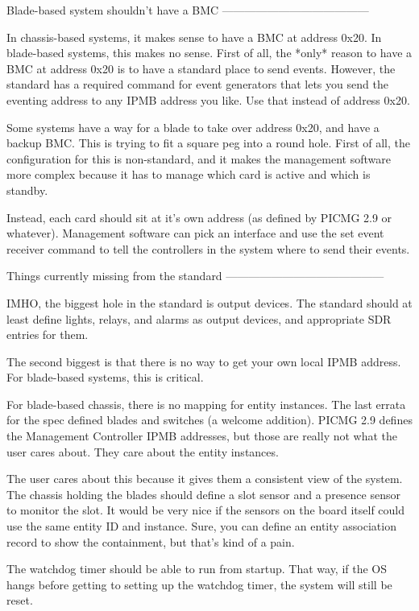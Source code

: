 Blade-based system shouldn't have a BMC
---------------------------------------

In chassis-based systems, it makes sense to have a BMC at address
0x20.  In blade-based systems, this makes no sense.  First of all, the
*only* reason to have a BMC at address 0x20 is to have a standard
place to send events.  However, the standard has a required command
for event generators that lets you send the eventing address to any
IPMB address you like.  Use that instead of address 0x20.

Some systems have a way for a blade to take over address 0x20, and
have a backup BMC.  This is trying to fit a square peg into a round
hole.  First of all, the configuration for this is non-standard, and
it makes the management software more complex because it has to manage
which card is active and which is standby.

Instead, each card should sit at it's own address (as defined by PICMG
2.9 or whatever).  Management software can pick an interface and use
the set event receiver command to tell the controllers in the system
where to send their events.


Things currently missing from the standard
------------------------------------------

IMHO, the biggest hole in the standard is output devices.  The
standard should at least define lights, relays, and alarms as output
devices, and appropriate SDR entries for them.

The second biggest is that there is no way to get your own local IPMB
address.  For blade-based systems, this is critical.

For blade-based chassis, there is no mapping for entity instances.
The last errata for the spec defined blades and switches (a welcome
addition).  PICMG 2.9 defines the Management Controller IPMB
addresses, but those are really not what the user cares about.  They
care about the entity instances.

The user cares about this because it gives them a consistent view of
the system.  The chassis holding the blades should define a slot
sensor and a presence sensor to monitor the slot.  It would be very
nice if the sensors on the board itself could use the same entity ID
and instance.  Sure, you can define an entity association record to
show the containment, but that's kind of a pain.

The watchdog timer should be able to run from startup.  That way, if
the OS hangs before getting to setting up the watchdog timer, the
system will still be reset.

